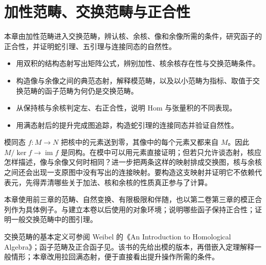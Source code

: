 
\chapter{加性范畴、交换范畴与正合性}
\label{b4:ch:04}

\begin{chapterabstract}
	本章由加性范畴进入交换范畴，辨认核、余核、像和余像所需的条件，研究函子的正合性，并证明蛇引理、五引理与连接同态的自然性。
\end{chapterabstract}

\begin{learninggoals}
	\begin{itemize}
		\item 用双积的结构态射写出矩阵公式，辨别加性、核余核存在性与交换范畴条件。
		\item 构造像与余像之间的典范态射，解释模范畴，以及以小范畴为指标、取值于交换范畴的函子范畴为何仍是交换范畴。
		\item 从保持核与余核判定左、右正合性，说明 Hom 与张量积的不同表现。
		\item 用满态射后的提升完成图追踪，构造蛇引理的连接同态并验证自然性。
	\end{itemize}
\end{learninggoals}

模同态 \(f:M\rightarrow N\) 把核中的元素送到零，其像中的每个元素又都来自 \(M\)。因此 \(M/\ker f\rightarrow\operatorname{im}f\) 是同构。在模中可以用元素直接证明；但若只允许谈态射，核应怎样描述，像与余像又何时相同？进一步把两条这样的映射排成交换图，核与余核之间还会出现一支原图中没有写出的连接映射。要构造这支映射并证明它不依赖代表元，先得弄清哪些关于加法、核和余核的性质真正参与了计算。

\ProseParagraphBreak
本章使用前三章的范畴、自然变换、有限极限和伴随，也以第二卷第三章的模正合列作为具体例子。与建立本卷以后使用的对象环境；说明哪些函子保持正合性；证明一般交换范畴中的图引理。

\ProseParagraphBreak
交换范畴的基本定义可参阅 Weibel 的《An Introduction to Homological Algebra》\cite[Section A.4, A.4.1, Definition A.4.2]{Weibel1994HomologicalAlgebra}；函子范畴及正合函子见\cite[Section 1.6, Functor Categories 1.6.4, Definition 1.6.6]{Weibel1994HomologicalAlgebra}。该书的\cite[Snake Lemma 1.3.2]{Weibel1994HomologicalAlgebra}先给出模的版本，再借嵌入定理解释一般情形；本章改用拉回满态射，便于直接看出提升操作所需的条件。

